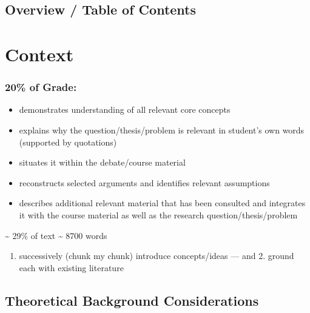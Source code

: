 \documentclass[
  letterpaper,
]{book}
\providecommand{\tightlist}{%
  \setlength{\itemsep}{0pt}\setlength{\parskip}{0pt}}
\begin{document}
\section{}\label{section}

\section{Overview / Table of Contents}\label{overview-table-of-contents}


\chapter{Context}\label{context}

\subsection*{20\% of Grade:}\label{of-grade}

\begin{itemize}
\item
  demonstrates understanding of all relevant core concepts
\item
  explains why the question/thesis/problem is relevant in student's own
  words (supported by quotations)
\item
  situates it within the debate/course material
\item
  reconstructs selected arguments and identifies relevant assumptions
\item
  describes additional relevant material that has been consulted and
  integrates it with the course material as well as the research
  question/thesis/problem
\end{itemize}

\textasciitilde{} 29\% of text \textasciitilde{} 8700 words

\begin{enumerate}
\def\labelenumi{\arabic{enumi}.}
\tightlist
\item
  successively (chunk my chunk) introduce concepts/ideas --- and 2.
  ground each with existing literature
\end{enumerate}

\section{Theoretical Background
Considerations}\label{theoretical-background-considerations}
\end{document}
